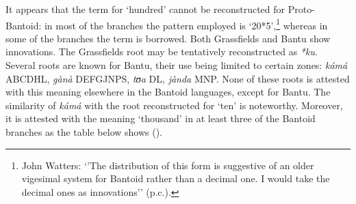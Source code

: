 It appears that the term for `hundred' cannot be reconstructed for Proto-Bantoid: in most of the branches the pattern employed is ‘20*5’,\footnote{John Watters: ‘’The distribution of this form is suggestive of an older vigesimal system for Bantoid rather than a decimal one. I would take the decimal ones as innovations’’ (p.c.).} whereas in some of the branches the term is borrowed. Both Grassfields and Bantu show innovations. The Grassfields root may be tentatively reconstructed as \textit{*ku}. Several roots are known for Bantu, their use being limited to certain zones: \textit{kámá} ABCDHL, \textit{gànà} DEFGJNPS, \textit{tʊa} DL, \textit{jànda} MNP. None of these roots is attested with this meaning elsewhere in the Bantoid languages, except for Bantu. The similarity of \textit{kámá} with the root reconstructed for `ten' is noteworthy. Moreover, it is attested with the meaning `thousand' in at least three of the Bantoid branches as the table below shows ().

